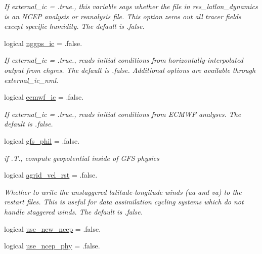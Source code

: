 \begin{DoxyCompactItemize}
\begin{DoxyCompactList}\small\item\em If external\-\_\-ic = .true., this variable says whether the file in res\-\_\-latlon\-\_\-dynamics is an N\-C\-E\-P analysis or reanalysis file. This option zeros out all tracer fields except specific humidity. The default is .false. \end{DoxyCompactList}\item 
logical \hyperlink{structfv__arrays__mod_1_1fv__flags__type_a55364a34def550dcbeee0f6da94186ef}{nggps\-\_\-ic} = .false.
\begin{DoxyCompactList}\small\item\em If external\-\_\-ic = .true., reads initial conditions from horizontally-\/interpolated output from chgres. The default is .false. Additional options are available through external\-\_\-ic\-\_\-nml. \end{DoxyCompactList}\item 
logical \hyperlink{structfv__arrays__mod_1_1fv__flags__type_a1b66904a5bb8b5264afae60f78e27090}{ecmwf\-\_\-ic} = .false.
\begin{DoxyCompactList}\small\item\em If external\-\_\-ic = .true., reads initial conditions from E\-C\-M\-W\-F analyses. The default is .false. \end{DoxyCompactList}\item 
logical \hyperlink{structfv__arrays__mod_1_1fv__flags__type_aa47220672025f2e6cb029aefcc9c466d}{gfs\-\_\-phil} = .false.
\begin{DoxyCompactList}\small\item\em if .T., compute geopotential inside of G\-F\-S physics \end{DoxyCompactList}\item 
logical \hyperlink{structfv__arrays__mod_1_1fv__flags__type_ad92b88b93aa90000c07053c042c1d310}{agrid\-\_\-vel\-\_\-rst} = .false.
\begin{DoxyCompactList}\small\item\em Whether to write the unstaggered latitude-\/longitude winds (ua and va) to the restart files. This is useful for data assimilation cycling systems which do not handle staggered winds. The default is .false. \end{DoxyCompactList}\item 
logical \hyperlink{structfv__arrays__mod_1_1fv__flags__type_a2b8599245902e918b0d12b82b6bd56cf}{use\-\_\-new\-\_\-ncep} = .false.
\item 
logical \hyperlink{structfv__arrays__mod_1_1fv__flags__type_a7ef4fa9739e6f84e06a89be8a7ed1739}{use\-\_\-ncep\-\_\-phy} = .false.

\end{DoxyCompactItemize}
